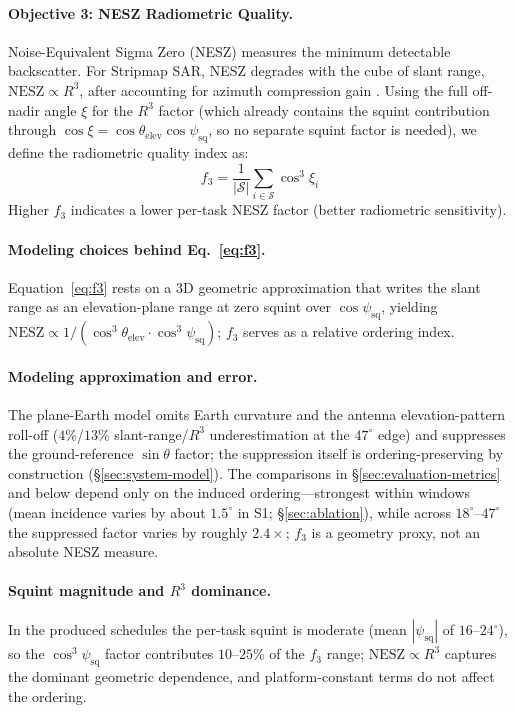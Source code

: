 \documentclass[preprint,12pt,authoryear]{elsarticle}
\begin{document}
\paragraph{Objective 3: NESZ Radiometric Quality.}
Noise-Equivalent Sigma Zero (NESZ) measures the minimum detectable backscatter.
For Stripmap SAR, NESZ degrades with the cube of slant range,
$\text{NESZ} \propto R^3$, after accounting for azimuth compression gain \citep{Curlander1991}.
Using the full off-nadir angle $\xi$ for the $R^3$ factor (which already
contains the squint contribution through $\cos\xi = \cos\theta_{\text{elev}}\cos\psi_{\text{sq}}$,
so no separate squint factor is needed), we define the radiometric quality index as:
\begin{equation}
f_3 = \frac{1}{|\mathcal{S}|} \sum_{i \in \mathcal{S}} \cos^3\xi_i
\label{eq:f3}
\end{equation}
Higher $f_3$ indicates a lower per-task NESZ factor (better radiometric sensitivity).

\paragraph{Modeling choices behind Eq.~\ref{eq:f3}.}
Equation~\ref{eq:f3} rests on a 3D geometric approximation that writes the slant range as an
elevation-plane range at zero squint over $\cos\psi_{\text{sq}}$, yielding $\text{NESZ} \propto
1/(\cos^3\theta_{\text{elev}} \cdot \cos^3\psi_{\text{sq}})$; $f_3$ serves as a relative ordering index.

\paragraph{Modeling approximation and error.}
The plane-Earth model omits Earth curvature and the antenna elevation-pattern roll-off
($4\%$/$13\%$ slant-range/$R^3$ underestimation at the $47^\circ$ edge) and suppresses the
ground-reference $\sin\theta$ factor; the suppression itself is ordering-preserving by
construction (\S\ref{sec:system-model}). The comparisons in \S\ref{sec:evaluation-metrics}
and below depend only on the induced ordering---strongest within windows (mean incidence
varies by about $1.5^\circ$ in S1; \S\ref{sec:ablation}), while across $18^\circ$--$47^\circ$
the suppressed factor varies by roughly $2.4\times$; $f_3$ is a geometry proxy, not an
absolute NESZ measure.

\paragraph{Squint magnitude and $R^3$ dominance.}
In the produced schedules the per-task squint is moderate (mean $|\psi_{\text{sq}}|$ of $16$--$24^\circ$), so
the $\cos^3\psi_{\text{sq}}$ factor contributes $10$--$25\%$ of the $f_3$ range; $\text{NESZ} \propto R^3$ captures
the dominant geometric dependence, and platform-constant terms do not affect the ordering.
\end{document}
